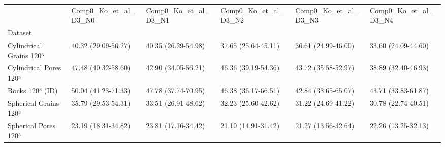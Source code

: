 \begin{tabular}{llllll}
\toprule
 & Comp0_Ko_et_al_D3_N0 & Comp0_Ko_et_al_D3_N1 & Comp0_Ko_et_al_D3_N2 & Comp0_Ko_et_al_D3_N3 & Comp0_Ko_et_al_D3_N4 \\
Dataset &  &  &  &  &  \\
\midrule
Cylindrical Grains 120³ & 40.32 (29.09-56.27) & 40.35 (26.29-54.98) & 37.65 (25.64-45.11) & 36.61 (24.99-46.00) & 33.60 (24.09-44.60) \\
Cylindrical Pores 120³ & 47.48 (40.32-58.60) & 42.90 (34.05-56.21) & 46.36 (39.19-54.36) & 43.72 (35.58-52.97) & 38.89 (32.40-46.93) \\
Rocks 120³ (ID) & 50.04 (41.23-71.33) & 47.78 (37.74-70.95) & 46.38 (36.17-66.51) & 42.84 (33.65-65.07) & 43.71 (33.83-61.87) \\
Spherical Grains 120³ & 35.79 (29.53-54.31) & 33.51 (26.91-48.62) & 32.23 (25.60-42.62) & 31.22 (24.69-41.22) & 30.78 (22.74-40.51) \\
Spherical Pores 120³ & 23.19 (18.31-34.82) & 23.81 (17.16-34.42) & 21.19 (14.91-31.42) & 21.27 (13.56-32.64) & 22.26 (13.25-32.13) \\
\bottomrule
\end{tabular}
